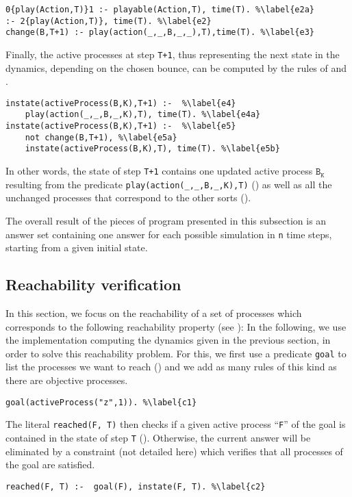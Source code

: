 \begin{lstlisting}
0{play(Action,T)}1 :- playable(Action,T), time(T). %\label{e2a} 
:- 2{play(Action,T)}, time(T). %\label{e2}
change(B,T+1) :- play(action(_,_,B,_,_),T),time(T). %\label{e3}
\end{lstlisting}

Finally, the active processes at step \texttt{T+1},
thus representing the next state in the dynamics, depending on the chosen bounce,
can be computed by the rules of  and .
\begin{lstlisting}
instate(activeProcess(B,K),T+1) :-  %\label{e4}
	play(action(_,_,B,_,K),T), time(T). %\label{e4a}
instate(activeProcess(B,K),T+1) :-  %\label{e5}
	not change(B,T+1), %\label{e5a}
	instate(activeProcess(B,K),T), time(T). %\label{e5b}
\end{lstlisting}
In other words, the state of step \texttt{T+1} contains one updated active process $\texttt{B}_\texttt{K}$
resulting from the predicate \texttt{play(action(\_,\_,B,\_,K),T)} ()
as well as all the unchanged processes that correspond to the other sorts ().

The overall result of the pieces of program presented in this subsection
is an answer set containing one answer for each
possible simulation in \texttt{n} time steps,
starting from a given initial state.

\subsection{Reachability verification}
In this section, we focus on the reachability of a set of processes which corresponds to the following reachability property (see ):
In the following, we use the implementation computing the dynamics given in the previous section, in order to solve this reachability problem.
For this, we first use a predicate \texttt{goal} to list the processes we want to reach () and we add as many rules of this kind as there are objective processes.
\begin{lstlisting}
goal(activeProcess("z",1)). %\label{c1}
\end{lstlisting}
The literal \texttt{reached(F, T)} then
checks if a given active process ``\texttt{F}'' of the goal
is contained in the state of step \texttt{T} ().
Otherwise, the current answer will be eliminated by a constraint (not detailed here) which verifies that all processes of the goal are satisfied.
\begin{lstlisting}
reached(F, T) :-  goal(F), instate(F, T). %\label{c2}
\end{lstlisting}


